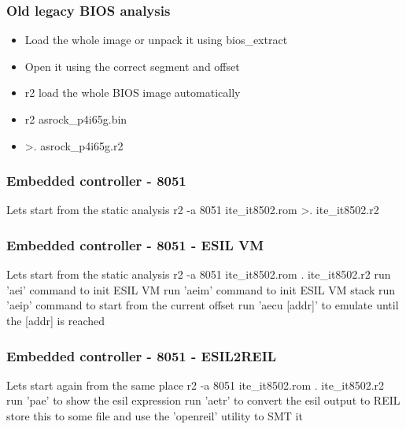 \documentclass[10pt, compress]{beamer}
\begin{document}

\begin{frame}[fragile]
  \frametitle{Old legacy BIOS analysis}
  \begin{itemize}
    \item Load the whole image or unpack it using bios\_extract
	\item Open it using the correct segment and offset
	\item r2 load the whole BIOS image automatically
	\item r2 asrock\_p4i65g.bin
	\item >. asrock\_p4i65g.r2
  \end{itemize}
\end{frame}


\begin{frame}[fragile]
  \frametitle{Embedded controller - 8051}
  \center Lets start from the static analysis
  \center r2 -a 8051 ite\_it8502.rom
  \center >. ite\_it8502.r2
\end{frame}


\begin{frame}[fragile]
  \frametitle{Embedded controller - 8051 - ESIL VM}
  \center Lets start from the static analysis
  \center r2 -a 8051 ite\_it8502.rom
  \center . ite\_it8502.r2
  \center run 'aei' command to init ESIL VM
  \center run 'aeim' command to init ESIL VM stack
  \center run 'aeip' command to start from the current offset
  \center run 'aecu [addr]' to emulate until the [addr] is reached
\end{frame}

\begin{frame}[fragile]
  \frametitle{Embedded controller - 8051 - ESIL2REIL}
  \center Lets start again from the same place
  \center r2 -a 8051 ite\_it8502.rom
  \center . ite\_it8502.r2
  \center run 'pae' to show the esil expression
  \center run 'aetr' to convert the esil output to REIL
  \center store this to some file and use the 'openreil' utility to SMT it
\end{frame}
\end{document}
